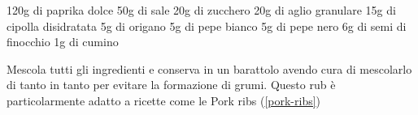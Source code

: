 \label{rub:delicato}
\begin{ingreds}
	120g di paprika dolce
	50g di sale
	20g di zucchero
	20g di aglio granulare
	15g di cipolla disidratata
	5g di origano
	5g di pepe bianco
	5g di pepe nero
	6g di semi di finocchio
	1g di cumino



\end{ingreds}

\begin{method}
Mescola tutti gli ingredienti e conserva in un barattolo avendo cura di mescolarlo di tanto in tanto per evitare la formazione di grumi. Questo rub è particolarmente adatto a ricette come le Pork ribs (\ref{pork-ribs})


\end{method}




